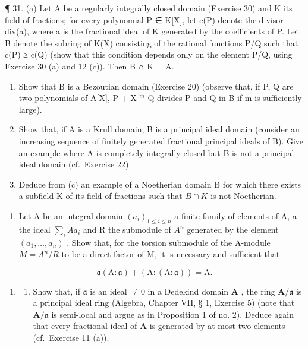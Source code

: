 ¶ 31. (a) Let A be a regularly integrally closed domain (Exercise 30) and K its field of fractions; for every polynomial P ∈ K{[}X{]}, let c(P) denote the divisor div(a), where a is the fractional ideal of K generated by the coefficients of P. Let B denote the subring of K(X) consisting of the rational functions P/Q such that c(P) ≥ c(Q) (show that this condition depends only on the element P/Q, using Exercise 30 (a) and 12 (c)). Then B ∩ K = A.

\begin{enumerate}
\def\labelenumi{(\alph{enumi})}
\setcounter{enumi}{1}
\item
  Show that B is a Bezoutian domain (Exercise 20) (observe that, if P, Q are two polynomials of A{[}X{]}, P + X \(^{m}\) Q divides P and Q in B if m is sufficiently large).
\item
  Show that, if A is a Krull domain, B is a principal ideal domain (consider an increasing sequence of finitely generated fractional principal ideals of B). Give an example where A is completely integrally closed but B is not a principal ideal domain (cf.~Exercise 22).
\item
  Deduce from (c) an example of a Noetherian domain B for which there exists a subfield K of its field of fractions such that \(B \cap K\) is not Noetherian.
\end{enumerate}

\begin{enumerate}
\def\labelenumi{\arabic{enumi}.}
\setcounter{enumi}{31}
\tightlist
\item
  Let A be an integral domain \((a_{i})_{1 \leqslant i \leqslant n}\) a finite family of elements of A, a the ideal \(\sum_{i} A a_{i}\) and R the submodule of \(A^{n}\) generated by the element \((a_{1}, \ldots, a_{n})\) . Show that, for the torsion submodule of the A-module \(M = A^{n}/R\) to be a direct factor of M, it is necessary and sufficient that
\end{enumerate}

\[
\mathfrak {a} (\mathrm{A}: \mathfrak {a}) + (\mathrm{A}: (\mathrm{A}: \mathfrak {a})) = \mathrm{A}.
\]


\begin{enumerate}
\def\labelenumi{\arabic{enumi}.}
\tightlist
\item
  \begin{enumerate}
  \def\labelenumii{(\alph{enumii})}
  \tightlist
  \item
    Show that, if \(\mathfrak{a}\) is an ideal \(\neq 0\) in a Dedekind domain \(\mathbf{A}\) , the ring \(\mathbf{A} / \mathfrak{a}\) is a principal ideal ring (Algebra, Chapter VII, § 1, Exercise 5) (note that \(\mathbf{A} / \mathfrak{a}\) is semi-local and argue as in Proposition 1 of no. 2). Deduce again that every fractional ideal of \(\mathbf{A}\) is generated by at most two elements (cf.~Exercise 11 (a)).
  \end{enumerate}
\end{enumerate}

